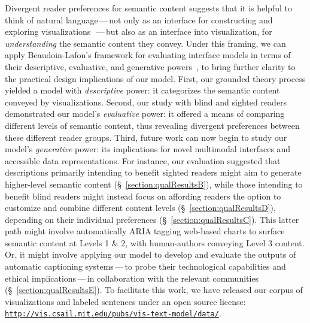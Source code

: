 Divergent reader preferences for semantic content suggests that it is helpful to think of natural language\,---\,not only as an interface for constructing and exploring visualizations~\cite{srinivasan_collecting_2021,gao_datatone_2015,setlur_eviza_2016}\,---\,but also as an {interface into visualization, for \emph{understanding} the semantic content they convey}.
Under this framing, we can apply Beaudoin-Lafon's framework for evaluating interface models in terms of their descriptive, evaluative, and generative powers~\cite{beaudouin-lafon_instrumental_2000, beaudouin-lafon_designing_2004}, to bring further clarity to the practical design implications of our model.
First, our grounded theory process yielded a model with \emph{descriptive} power: it categorizes the semantic content conveyed by visualizations.
Second, our study with blind and sighted readers demonstrated our model's \emph{evaluative} power: it offered a means of comparing different levels of semantic content, thus revealing divergent preferences between these different reader groups.
Third, future work can now begin to study our model's \emph{generative} power:
its implications for novel multimodal interfaces and accessible data representations.
For instance, our evaluation suggested that descriptions primarily intending to benefit sighted readers might aim to generate higher-level semantic content (\S~\ref{section:qualResultsB}), while those intending to benefit blind readers might instead focus on affording readers the option to customize and combine different content levels (\S~\ref{section:qualResultsD}), depending on their individual preferences (\S~\ref{section:qualResultsC}).
This latter path might involve automatically \ac{ARIA} tagging web-based charts to surface semantic content at Levels 1 \& 2, with human-authors conveying Level 3 content. Or, it might involve applying our model to develop and evaluate the outputs of automatic captioning systems\,---\,to probe their technological capabilities and ethical implications\,---\,in collaboration with the relevant communities (\S~\ref{section:qualResultsE}).
To facilitate this work, we have released our corpus of visualizations and labeled sentences under an open source license: 
\href{http://vis.csail.mit.edu/pubs/vis-text-model/data/}{\texttt{http://vis.csail.mit.edu/pubs/vis-text-model/data/}}.

